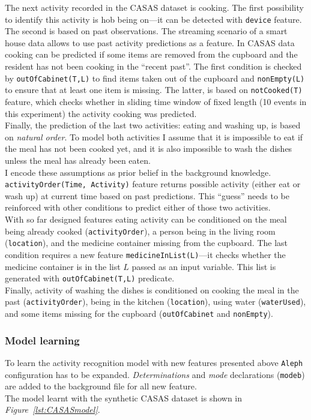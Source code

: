 \documentclass[10pt, a4paper, pdflatex, leqno, twoside, openright]{report}
\begin{document}
The next activity recorded in the CASAS dataset is cooking. The first possibility to identify this activity is hob being on---it can be detected with \texttt{device} feature.\\
The second is based on past observations. The streaming scenario of a smart house data allows to use past activity predictions as a feature. In CASAS data cooking can be predicted if some items are removed from the cupboard and the resident has not been cooking in the ``recent past''. The first condition is checked by \texttt{outOfCabinet(T,L)} to find items taken out of the cupboard and \texttt{nonEmpty(L)} to ensure that at least one item is missing. The latter, is based on \texttt{notCooked(T)} feature, which checks whether in sliding time window of fixed length (10 events in this experiment) the activity cooking was predicted.\\

Finally, the prediction of the last two activities: eating and washing up, is based on \emph{natural order}. To model both activities I assume that it is impossible to eat if the meal has not been cooked yet, and it is also impossible to wash the dishes unless the meal has already been eaten.\\
I encode these assumptions as prior belief in the background knowledge. \texttt{activityOrder(Time, Activity)} feature returns possible activity (either eat or wash up) at current time based on past predictions. This ``guess'' needs to be reinforced with other conditions to predict either of those two activities.\\
With so far designed features eating activity can be conditioned on the meal being already cooked (\texttt{activityOrder}), a person being in the living room (\texttt{location}), and the medicine container missing from the cupboard. The last condition requires a new feature \texttt{medicineInList(L)}---it checks whether the medicine container is in the list $L$ passed as an input variable. This list is generated with \texttt{outOfCabinet(T,L)} predicate.\\
Finally, activity of washing the dishes is conditioned on cooking the meal in the past (\texttt{activityOrder}), being in the kitchen (\texttt{location}), using water (\texttt{waterUsed}), and some items missing for the cupboard (\texttt{outOfCabinet} and \texttt{nonEmpty}).

      \subsubsection{Model learning}
To learn the activity recognition model with new features presented above \texttt{Aleph} configuration has to be expanded. \emph{Determinations} and \emph{mode} declarations (\texttt{modeb}) are added to the background file for all new feature.\\
The model learnt with the synthetic CASAS dataset is shown in \emph{Figure~\ref{lst:CASASmodel}}.
\end{document}
